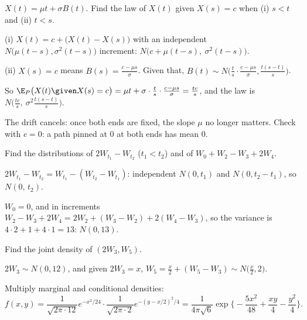 \begin{problem}
$X(t)=\mu t+\sigma B(t)$. Find the law of $X(t)$ given $X(s)=c$ when (i) $s<t$ and (ii) $t<s$.
\begin{steps}
  \item (i) $X(t)=c+\big(X(t)-X(s)\big)$ with an independent $N\big(\mu(t-s),\sigma^2(t-s)\big)$ increment: $N\big(c+\mu(t-s),\ \sigma^2(t-s)\big)$.
  \item (ii) $X(s)=c$ means $B(s)=\frac{c-\mu s}{\sigma}$. Given that, $B(t)\sim N\big(\frac ts\cdot\frac{c-\mu s}{\sigma},\frac{t(s-t)}{s}\big)$.
  \item So $\E_P\big(X(t)\given X(s)=c\big)=\mu t+\sigma\cdot\frac ts\cdot\frac{c-\mu s}{\sigma}=\frac{tc}{s}$, and the law is $N\big(\frac{tc}s,\ \sigma^2\frac{t(s-t)}{s}\big)$.
\end{steps}
The drift cancels: once both ends are fixed, the slope $\mu$ no longer matters. Check with $c=0$: a path pinned at $0$ at both ends has mean $0$.
\end{problem}


\begin{problem}
Find the distributions of $2W_{t_1}-W_{t_2}$ ($t_1<t_2$) and of $W_0+W_2-W_3+2W_4$.
\begin{steps}
  \item $2W_{t_1}-W_{t_2}=W_{t_1}-(W_{t_2}-W_{t_1})$: independent $N(0,t_1)$ and $N(0,t_2-t_1)$, so $N(0,\,t_2)$.
  \item $W_0=0$, and in increments $W_2-W_3+2W_4=2W_2+(W_3-W_2)+2(W_4-W_3)$, so the variance is $4\cdot2+1+4\cdot1=13$: $N(0,13)$.
\end{steps}
\end{problem}

\begin{problem}
Find the joint density of $(2W_3,W_5)$.
\begin{steps}
  \item $2W_3\sim N(0,12)$, and given $2W_3=x$, $W_5=\frac x2+(W_5-W_3)\sim N\big(\frac x2,2\big)$.
  \item Multiply marginal and conditional densities:
  \[
    f(x,y)=\frac{1}{\sqrt{2\pi\cdot12}}e^{-x^2/24}\cdot\frac{1}{\sqrt{2\pi\cdot2}}e^{-(y-x/2)^2/4}
    =\frac{1}{4\pi\sqrt6}\exp\Big\{-\frac{5x^2}{48}+\frac{xy}{4}-\frac{y^2}{4}\Big\}.
  \]
\end{steps}
\end{problem}

